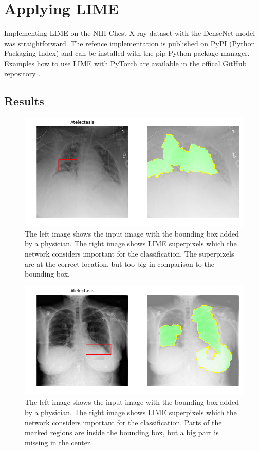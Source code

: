 \section{Applying LIME}
Implementing LIME on the NIH Chest X-ray dataset with the DenseNet model was straightforward. The refence implementation is published on PyPI (Python Packaging Index) and can be installed with the pip Python package manager. Examples how to use LIME with PyTorch are available in the offical GitHub repository \cite{limegithub}.


\subsection{Results}
\begin{figure}[H]
\centering
\includegraphics[width=12cm]{chapters/03_classification/images/lime_0.png}
\caption{The left image shows the input image with the bounding box added by a physician. The right image shows LIME superpixels which the network considers important for the classification. The superpixels are at the correct location, but too big in comparison to the bounding box.}
\label{lime_example_1}
\end{figure}

\begin{figure}[H]
\centering
\includegraphics[width=12cm]{chapters/03_classification/images/lime_2.png}
\caption{The left image shows the input image with the bounding box added by a physician. The right image shows LIME superpixels which the network considers important for the classification. Parts of the marked regions are inside the bounding box, but a big part is missing in the center.}
\label{lime_example_2}
\end{figure}

